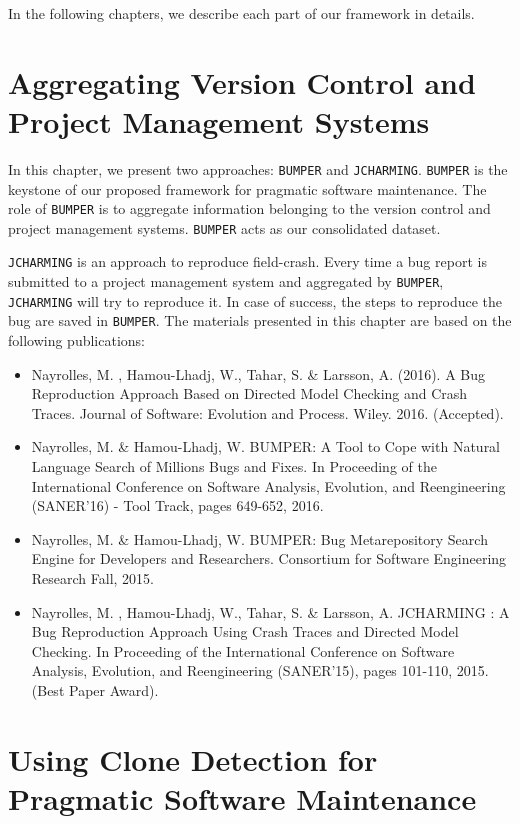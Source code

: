 In the following chapters, we describe each part of our framework in details.

\chapter{Aggregating Version Control and Project Management Systems\label{chap:aggreating}}

In this chapter, we present two approaches: {\tt BUMPER} and {\tt JCHARMING}.
{\tt BUMPER} is the keystone of our proposed framework for pragmatic software maintenance.
The role of {\tt BUMPER} is to aggregate information belonging to the version control and project management systems.
{\tt BUMPER} acts as our consolidated dataset.

{\tt JCHARMING} is an approach to reproduce field-crash.
Every time a bug report is submitted to a project management system and aggregated by {\tt BUMPER}, {\tt JCHARMING} will try to reproduce it.
In case of success, the steps to reproduce the bug are saved in {\tt BUMPER}.
The materials presented in this chapter are based on the following publications:

\begin{itemize}
	\item Nayrolles, M. , Hamou-Lhadj, W., Tahar, S. & Larsson, A. (2016). A Bug Reproduction Approach Based on Directed Model Checking and Crash Traces. Journal of Software: Evolution and Process. Wiley. 2016. (Accepted).
	\item Nayrolles, M. \& Hamou-Lhadj, W. BUMPER: A Tool to Cope with Natural Language Search of Millions Bugs and Fixes. In Proceeding of the International Conference on Software Analysis, Evolution, and Reengineering (SANER'16) - Tool Track, pages 649-652, 2016.
	\item Nayrolles, M. \& Hamou-Lhadj, W. BUMPER: Bug Metarepository Search Engine for Developers and Researchers. Consortium for Software Engineering Research Fall, 2015.
	\item Nayrolles, M. , Hamou-Lhadj, W., Tahar, S. & Larsson, A. JCHARMING : A Bug Reproduction Approach Using Crash Traces and Directed Model Checking. In Proceeding of the International Conference on Software Analysis, Evolution, and Reengineering (SANER'15), pages 101-110, 2015. (Best Paper Award).
\end{itemize}




\chapter{Using Clone Detection for Pragmatic Software Maintenance\label{chap:clone-detection-pragmatic}}

